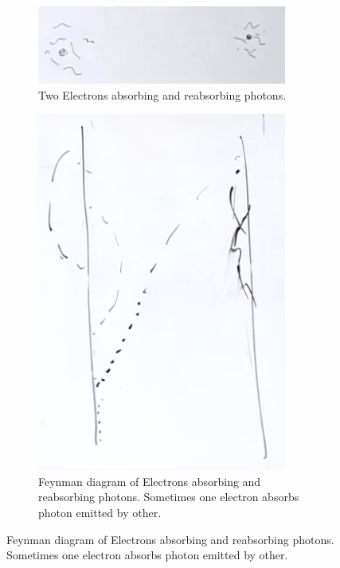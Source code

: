 \documentclass[]{article}
\begin{document}
\begin{figure}[H]
	\caption{Two Electrons absorbing and reabsorbing photons}
	\begin{subfigure}[t]{0.45\textwidth}
		\caption{Two Electrons absorbing and reabsorbing photons.}\label{fig:2-1-second-electron-photons}
		\includegraphics[width=0.9\textwidth]{2-1-second-electron-photons}
	\end{subfigure}
	\hfill
	\begin{subfigure}[t]{0.45\textwidth}
		\caption{Feynman diagram of Electrons absorbing and reabsorbing photons. Sometimes one electron absorbs photon emitted by other.}\label{fig:2-1-electron-photons-feynmann}
		\includegraphics[width=0.9\textwidth]{2-1-second-electron-photons-feynman}
	\end{subfigure}
\end{figure}
\end{document}
